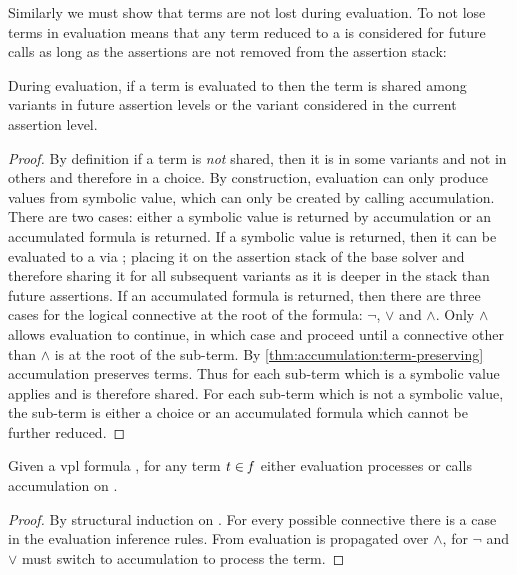 Similarly we must show that terms are not lost during evaluation. To not lose
terms in evaluation means that any term reduced to a \unit{} is considered for
future  calls as long as the assertions are not removed from the
assertion stack:

\begin{theorem}
  \label{thm:evaluation:term-preserving}
  During evaluation, if a term is evaluated to \unit{} then the term is shared
  among variants in future assertion levels or the variant considered in the
  current assertion level.
\end{theorem}
%
\begin{proof}
  By definition if a term is \emph{not} shared, then it is in some variants and
  not in others and therefore in a choice. By construction, evaluation can only
  produce \unit{} values from symbolic value, which can only be created by
  calling accumulation. There are two cases: either a symbolic value is returned
  by accumulation or an accumulated formula is returned. If a symbolic value is
  returned, then it can be evaluated to a \unit{} via \evSym{}; placing it on
  the assertion stack of the base solver and therefore sharing it for all
  subsequent variants as it is deeper in the stack than future assertions. If an
  accumulated formula is returned, then there are three cases for the logical
  connective at the root of the formula: $\neg$, $\vee$ and $\wedge$. Only
  $\wedge$ allows evaluation to continue, in which case \evSym{} and \evAnd{}
  proceed until a connective other than $\wedge$ is at the root of the sub-term.
  By \autoref{thm:accumulation:term-preserving} accumulation preserves terms.
  Thus for each sub-term which is a symbolic value \evSym{} applies and is
  therefore shared. For each sub-term which is not a symbolic value, the
  sub-term is either a choice or an accumulated formula which cannot be further
  reduced.
\end{proof}

\begin{lemma}
  \label{lemma:ev:all-terms}
  Given a \ac{vpl} formula \fV{}, for any term $\mathit{t}{} \in \mathit{f}{}$ either
  evaluation processes \tV{} or calls accumulation on \tV{}.
\end{lemma}
%
\begin{proof}
  By structural induction on \tV{}. For every possible connective there is a
  case in the evaluation inference rules. From \evAnd{} evaluation is
  propagated over $\wedge$, for $\neg$ and $\vee$ must switch to accumulation to
  process the term.
\end{proof}

